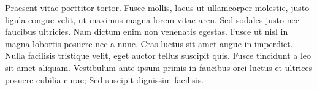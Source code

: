 

	Praesent vitae porttitor tortor. Fusce mollis, lacus ut ullamcorper molestie, justo ligula congue velit, ut maximus magna lorem vitae arcu. Sed sodales justo nec faucibus ultricies. Nam dictum enim non venenatis egestas. Fusce ut nisl in magna lobortis posuere nec a nunc. Cras luctus sit amet augue in imperdiet. Nulla facilisis tristique velit, eget auctor tellus suscipit quis. Fusce tincidunt a leo sit amet aliquam. Vestibulum ante ipsum primis in faucibus orci luctus et ultrices posuere cubilia curae; Sed suscipit dignissim facilisis.